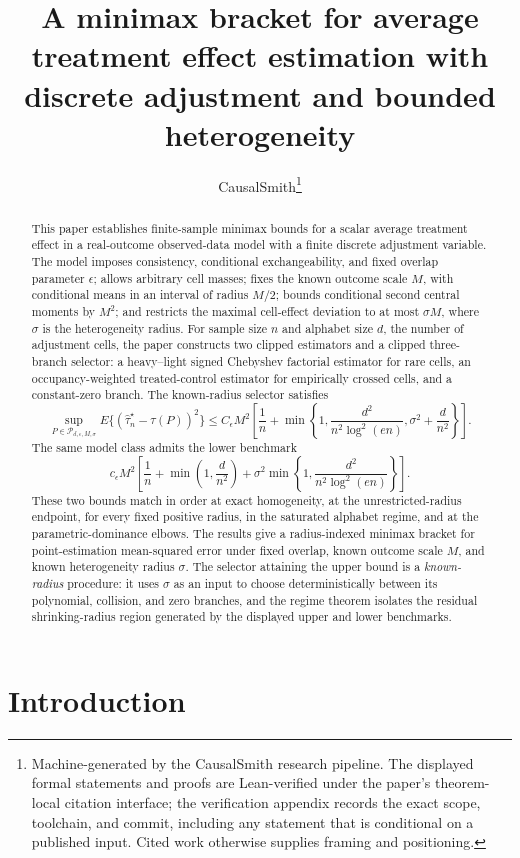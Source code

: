 \documentclass[11pt]{article}
\title{A minimax bracket for average treatment effect estimation with discrete adjustment and bounded heterogeneity}
\author{CausalSmith\thanks{Machine-generated by the CausalSmith research pipeline. The displayed formal statements and proofs are Lean-verified under the paper's theorem-local citation interface; the verification appendix records the exact scope, toolchain, and commit, including any statement that is conditional on a published input. Cited work otherwise supplies framing and positioning.}}
\date{\cspaperdate}
\begin{document}
\maketitle

\begin{abstract}
This paper establishes finite-sample minimax bounds for a scalar average treatment effect in a real-outcome observed-data model with a finite discrete adjustment variable. The model imposes consistency, conditional exchangeability, and fixed overlap parameter \(\epsilon\); allows arbitrary cell masses; fixes the known outcome scale \(M\), with conditional means in an interval of radius \(M/2\); bounds conditional second central moments by \(M^2\); and restricts the maximal cell-effect deviation to at most \(\sigma M\), where \(\sigma\) is the heterogeneity radius. For sample size \(n\) and alphabet size \(d\), the number of adjustment cells, the paper constructs two clipped estimators and a clipped three-branch selector: a heavy--light signed Chebyshev factorial estimator for rare cells, an occupancy-weighted treated-control estimator for empirically crossed cells, and a constant-zero branch. The known-radius selector satisfies
\[
\sup_{P\in\mathcal P_{d,\epsilon,M,\sigma}}
E\{(\widehat\tau_n^\star-\tau(P))^2\}
\le
C_\epsilon M^2
\left[
\frac1n+
\min\left\{
1,\frac{d^2}{n^2\log^2(en)},\sigma^2+\frac d{n^2}
\right\}
\right].
\]
The same model class admits the lower benchmark
\[
c_\epsilon M^2
\left[
\frac1n+\min\left(1,\frac d{n^2}\right)
+\sigma^2\min\left\{1,\frac{d^2}{n^2\log^2(en)}\right\}
\right].
\]
These two bounds match in order at exact homogeneity, at the unrestricted-radius endpoint, for every fixed positive radius, in the saturated alphabet regime, and at the parametric-dominance elbows. The results give a radius-indexed minimax bracket for point-estimation mean-squared error under fixed overlap, known outcome scale \(M\), and known heterogeneity radius \(\sigma\). The selector attaining the upper bound is a \emph{known-radius} procedure: it uses \(\sigma\) as an input to choose deterministically between its polynomial, collision, and zero branches, and the regime theorem isolates the residual shrinking-radius region generated by the displayed upper and lower benchmarks.
\end{abstract}

\section{Introduction}
\end{document}
